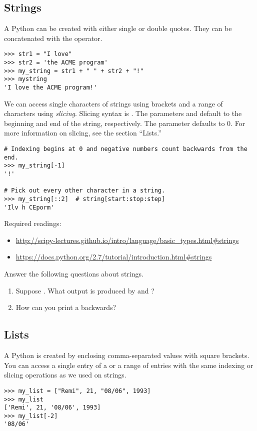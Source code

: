 \subsection*{Strings}
A Python  can be created with either single or double quotes. They can be concatenated with the \li{+} operator.
\begin{lstlisting}
>>> str1 = "I love"
>>> str2 = 'the ACME program'
>>> my_string = str1 + " " + str2 + "!"
>>> mystring
'I love the ACME program!'
\end{lstlisting}

We can access single characters of strings using brackets and a range of characters using \emph{slicing}. Slicing syntax is . The parameters  and  default to the beginning and end of the string, respectively. The parameter  defaults to 0. For more information on slicing, see the section ``Lists.''

\begin{lstlisting}
# Indexing begins at 0 and negative numbers count backwards from the end.
>>> my_string[-1]
'!'

# Pick out every other character in a string.
>>> my_string[::2]	# string[start:stop:step]
'Ilv h CEporm'
\end{lstlisting}

Required readings: 
\begin{itemize}
\item \url{http://scipy-lectures.github.io/intro/language/basic_types.html#strings}
\item \url{https://docs.python.org/2.7/tutorial/introduction.html#strings}
\end{itemize}

\begin{problem}
Answer the following questions about strings.
\begin{enumerate}
\item Suppose . What output is produced by  and ? 
\item How can you print a  backwards?
\end{enumerate}
\end{problem}


\subsection*{Lists}
A Python  is created by enclosing comma-separated values with square brackets. You can access a single entry of a  or a range of entries with the same indexing or slicing operations as we used on strings. 
\begin{lstlisting}
>>> my_list = ["Remi", 21, "08/06", 1993]
>>> my_list
['Remi', 21, '08/06', 1993]
>>> my_list[-2]
'08/06'
\end{lstlisting}

